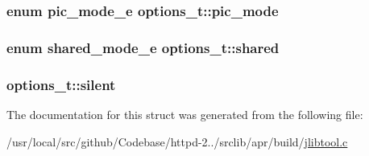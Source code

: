 \subsubsection[{\texorpdfstring{pic\+\_\+mode}{pic_mode}}]{\setlength{\rightskip}{0pt plus 5cm}enum {\bf pic\+\_\+mode\+\_\+e} options\+\_\+t\+::pic\+\_\+mode}\hypertarget{structoptions__t_aed4211854d35e2c2d37a59f59f5d7add}{}\label{structoptions__t_aed4211854d35e2c2d37a59f59f5d7add}
\subsubsection[{\texorpdfstring{shared}{shared}}]{\setlength{\rightskip}{0pt plus 5cm}enum {\bf shared\+\_\+mode\+\_\+e} options\+\_\+t\+::shared}\hypertarget{structoptions__t_ada7e7fabb6fa763bb613576b005d9ebb}{}\label{structoptions__t_ada7e7fabb6fa763bb613576b005d9ebb}
\subsubsection[{\texorpdfstring{silent}{silent}}]{ options\+\_\+t\+::silent}\hypertarget{structoptions__t_a4003119916f574a1f52bcd8d9373e989}{}\label{structoptions__t_a4003119916f574a1f52bcd8d9373e989}


The documentation for this struct was generated from the following file\+:\begin{DoxyCompactItemize}
\item 
/usr/local/src/github/\+Codebase/httpd-\/2../srclib/apr/build/\hyperlink{jlibtool_8c}{jlibtool.\+c}\end{DoxyCompactItemize}
